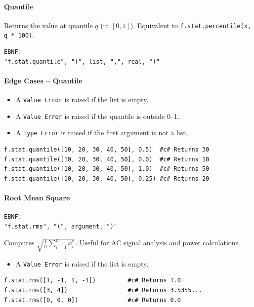 \paragraph{Quantile}
Returns the value at quantile $q$ (in $[0, 1]$). Equivalent to \texttt{f.stat.percentile(x, q * 100)}.
\begin{verbatim}
EBNF:
"f.stat.quantile", "(", list, ",", real, ")"
\end{verbatim}

\paragraph{Edge Cases -- Quantile}
\begin{itemize}
\item A \texttt{Value Error} is raised if the list is empty.
\item A \texttt{Value Error} is raised if the quantile is outside 0--1.
\item A \texttt{Type Error} is raised if the first argument is not a list.
\end{itemize}
\begin{verbatim}
f.stat.quantile([10, 20, 30, 40, 50], 0.5)  #c# Returns 30
f.stat.quantile([10, 20, 30, 40, 50], 0.0)  #c# Returns 10
f.stat.quantile([10, 20, 30, 40, 50], 1.0)  #c# Returns 50
f.stat.quantile([10, 20, 30, 40, 50], 0.25) #c# Returns 20
\end{verbatim}

\paragraph{Root Mean Square}
\begin{verbatim}
EBNF:
"f.stat.rms", "(", argument, ")"
\end{verbatim}
Computes $\sqrt{\frac{1}{n}\sum_{i=1}^{n} x_i^2}$. Useful for AC signal analysis and power calculations.
\begin{itemize}
\item A \texttt{Value Error} is raised if the list is empty.
\end{itemize}
\begin{verbatim}
f.stat.rms([1, -1, 1, -1])         #c# Returns 1.0
f.stat.rms([3, 4])                 #c# Returns 3.5355...
f.stat.rms([0, 0, 0])              #c# Returns 0.0
\end{verbatim}

